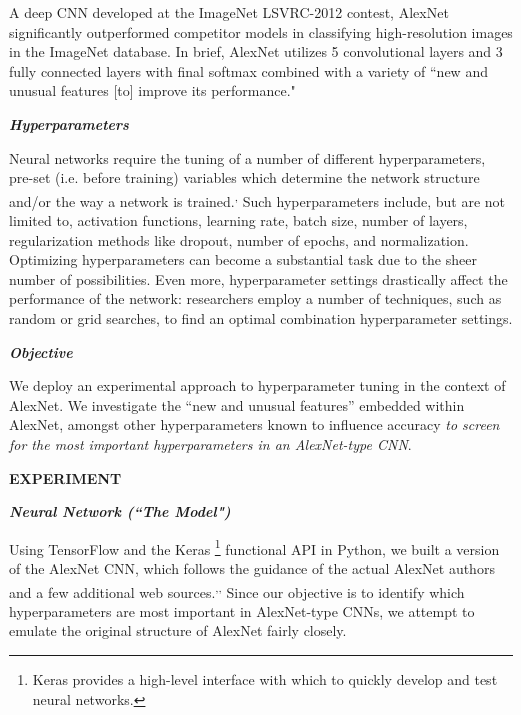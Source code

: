 \documentclass[12pt]{article}
\begin{document}
A deep CNN developed at the ImageNet LSVRC-2012 contest, AlexNet significantly outperformed competitor models in classifying high-resolution images in the ImageNet database. In brief, AlexNet utilizes 5 convolutional layers and 3 fully connected layers with final softmax combined with a variety of ``new and unusual features [to] improve its performance."

\vspace{.5pc}
\noindent \textbf{\textit{Hyperparameters}}
\vspace{.1pc}

Neural networks require the tuning of a number of different hyperparameters, pre-set (i.e. before training) variables which determine the network structure and/or the way a network is trained.\textsuperscript{,} Such hyperparameters include, but are not limited to, activation functions, learning rate, batch size, number of layers, regularization methods like dropout, number of epochs, and normalization. Optimizing hyperparameters can become a substantial task due to the sheer number of possibilities. Even more, hyperparameter settings drastically affect the performance of the network: researchers employ a number of techniques, such as random or grid searches, to find an optimal combination hyperparameter settings.

\vspace{.5pc}
\noindent \textbf{\textit{Objective}}
\vspace{.1pc}

We deploy an experimental approach to hyperparameter tuning in the context of AlexNet. We investigate the “new and unusual features” embedded within AlexNet, amongst other hyperparameters known to influence accuracy \textit{to screen for the most important hyperparameters in an AlexNet-type CNN}.


\vspace{.75pc}
{\noindent \sc \textbf{EXPERIMENT}}

\vspace{.5pc}
\noindent \textbf{\textit{Neural Network (``The Model")}}
\vspace{.1pc}

Using TensorFlow and the Keras \footnote{Keras provides a high-level interface with which to quickly develop and test neural networks.} functional API in Python, we built a version of the AlexNet CNN, which follows the guidance of the actual AlexNet authors and a few additional web sources.\textsuperscript{,}\textsuperscript{,}  
Since our objective is to identify which hyperparameters are most important in AlexNet-type CNNs, we attempt to emulate the original structure of AlexNet fairly closely. 
\end{document}
